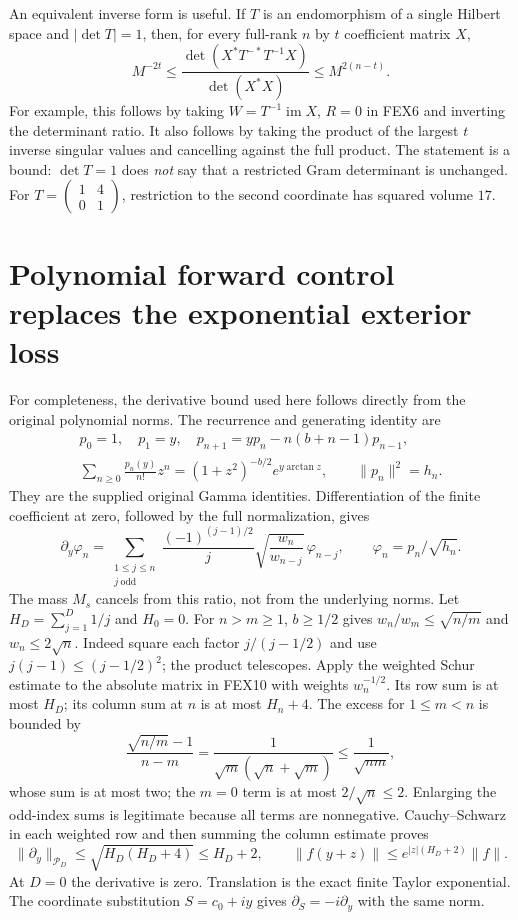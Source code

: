 \documentclass[11pt,a4paper]{article}
\begin{document}
An equivalent inverse form is useful. If $T$ is an endomorphism of a
single Hilbert space and $|\det T|=1$, then, for every full-rank $n$ by
$t$ coefficient matrix $X$,
\[
 \boxed{\quad
 M^{-2t}\le
 \frac{\det(X^*T^{-*}T^{-1}X)}{\det(X^*X)}
 \le M^{2(n-t)}.
 \quad}\tag{FEX8}
\]
For example, this follows by taking $W=T^{-1}\operatorname{im}X$, $R=0$
in FEX6 and inverting the determinant ratio. It also follows by taking
the product of the largest $t$ inverse singular values and cancelling
against the full product. The statement is a bound: $\det T=1$ does
\emph{not} say that a restricted Gram determinant is unchanged.
For $T=\left(\begin{smallmatrix}1&4\\0&1\end{smallmatrix}\right)$,
restriction to the second coordinate has squared volume $17$.

\section{Polynomial forward control replaces the exponential exterior loss}
\label{sec:FEX-forward}
For completeness, the derivative bound used here follows directly from
the original polynomial norms. The recurrence and generating identity are
\[
\begin{gathered}
 p_0=1,\quad p_1=y,\quad
 p_{n+1}=yp_n-n(b+n-1)p_{n-1},\\
 \sum_{n\ge0}\frac{p_n(y)}{n!}z^n
       =(1+z^2)^{-b/2}e^{y\arctan z},\qquad \|p_n\|^2=h_n.
\end{gathered}\tag{FEX9}
\]
They are the supplied original Gamma identities. Differentiation of the
finite coefficient at zero, followed by the full normalization, gives
\[
 \partial_y\varphi_n=
 \sum_{\substack{1\le j\le n\\j\ \mathrm{odd}}}
 \frac{(-1)^{(j-1)/2}}{j}\sqrt{\frac{w_n}{w_{n-j}}}\,
 \varphi_{n-j},\qquad \varphi_n=p_n/\sqrt{h_n}.
 \tag{FEX10}
\]
The mass $M_s$ cancels from this ratio, not from the underlying norms.
Let $H_D=\sum_{j=1}^D1/j$ and $H_0=0$. For $n>m\ge1$, $b\ge1/2$ gives
$w_n/w_m\le\sqrt{n/m}$ and $w_n\le2\sqrt n$. Indeed square each factor
$j/(j-1/2)$ and use $j(j-1)\le(j-1/2)^2$; the product telescopes.
Apply the weighted Schur estimate to the absolute matrix in FEX10 with
weights $w_n^{-1/2}$. Its row sum is at most $H_D$; its column sum at $n$
is at most $H_n+4$. The excess for $1\le m<n$ is bounded by
\[
 \frac{\sqrt{n/m}-1}{n-m}
 =\frac1{\sqrt m(\sqrt n+\sqrt m)}\le\frac1{\sqrt{nm}},
\]
whose sum is at most two; the $m=0$ term is at most $2/\sqrt n\le2$.
Enlarging the odd-index sums is legitimate because all terms are
nonnegative. Cauchy--Schwarz in each weighted row and then summing the
column estimate proves
\[
 \|\partial_y\|_{\mathcal P_D}\le\sqrt{H_D(H_D+4)}\le H_D+2,
 \qquad \|f(y+z)\|\le e^{|z|(H_D+2)}\|f\|.
 \tag{FEX11}
\]
At $D=0$ the derivative is zero. Translation is the exact finite Taylor
exponential. The coordinate substitution $S=c_0+iy$ gives
$\partial_S=-i\partial_y$ with the same norm.
\end{document}
